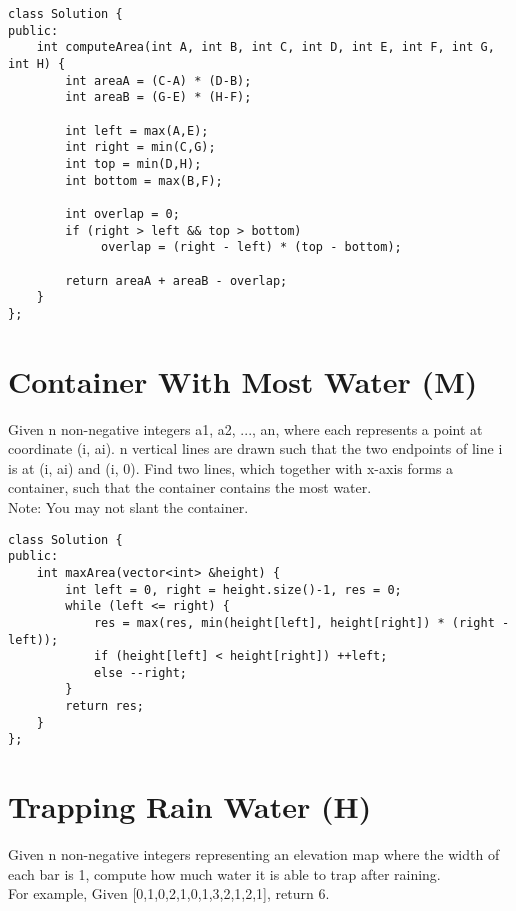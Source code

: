 \begin{lstlisting}
class Solution {
public:
    int computeArea(int A, int B, int C, int D, int E, int F, int G, int H) {
        int areaA = (C-A) * (D-B);
        int areaB = (G-E) * (H-F);
        
        int left = max(A,E);
        int right = min(C,G);
        int top = min(D,H);
        int bottom = max(B,F);
        
        int overlap = 0;
        if (right > left && top > bottom)
             overlap = (right - left) * (top - bottom);
             
        return areaA + areaB - overlap;
    }
};
\end{lstlisting}


\section{Container With Most Water (M)}
Given n non-negative integers a1, a2, ..., an, where each represents a point at coordinate (i, ai). n vertical lines are drawn such that the two endpoints of line i is at (i, ai) and (i, 0). Find two lines, which together with x-axis forms a container, such that the container contains the most water.\\

Note: You may not slant the container. \\

\begin{lstlisting}
class Solution {
public:
    int maxArea(vector<int> &height) {
        int left = 0, right = height.size()-1, res = 0;
        while (left <= right) {
            res = max(res, min(height[left], height[right]) * (right - left));
            if (height[left] < height[right]) ++left;
            else --right;
        }
        return res;
    }
};
\end{lstlisting}


\section {Trapping Rain Water (H)}
Given n non-negative integers representing an elevation map where the width of each bar is 1, compute how much water it is able to trap after raining.\\

For example, Given [0,1,0,2,1,0,1,3,2,1,2,1], return 6. \\

